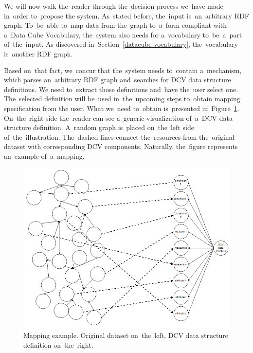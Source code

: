 We will now walk the~reader through the~decision process we~have made in~order to~propose 
the system. As~stated before, the~input is~an~arbitrary RDF graph. To~be~able to~map data from the~graph to~a~form compliant with a~Data 
Cube Vocabulary, the~system also needs for a~vocabulary to~be~a~part of~the~input. 
As discovered in~Section~\ref{datacube-vocabulary}, the~vocabulary is~another 
RDF graph.

Based on~that fact, we~concur that the~system needs to~contain a~mechanism, which 
parses an~arbitrary RDF graph and~searches for DCV data structure definitions. 
We need to~extract those definitions and~have the~user select one. The~selected 
definition will be~used in~the~upcoming steps to~obtain mapping specification from 
the user. What we~need to~obtain is~presented in~Figure~\ref{fig:mapping-example}.
On~the~right side the~reader can see a~generic visualization of~a~DCV data structure definition. A~random graph is~placed on~the~left side of~the~illustration. The~dashed lines connect the~resources 
from the~original dataset with corresponding DCV components. Naturally, the~figure represents an~example of~a~mapping.

\begin{figure}
	\centering
	\includegraphics[width=140mm]{img/mapping-example.png}
	\caption{Mapping example. Original dataset on~the~left, DCV data structure definition on~the~right.}
	\label{fig:mapping-example}
\end{figure}

